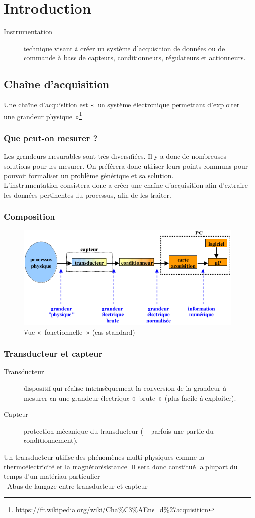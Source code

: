 \chapter{Introduction}
\begin{description}
	\item[Instrumentation] technique visant à créer un système d'acquisition de données ou de commande à base de capteurs, conditionneurs, régulateurs et actionneurs.
\end{description}
\section{Chaîne d’acquisition}
Une chaîne d'acquisition est «~un système électronique permettant d'exploiter une grandeur physique~»\footnote{\url{https://fr.wikipedia.org/wiki/Cha\%C3\%AEne_d\%27acquisition}}
\subsection{Que peut-on mesurer ?}
Les grandeurs mesurables sont très diversifiées. Il y a donc de nombreuses solutions pour les mesurer. On préférera donc utiliser leurs points communs pour pouvoir formaliser un problème générique et sa solution.\\

L'instrumentation consistera donc a créer une chaîne d'acquisition afin d'extraire les données
pertinentes du processus, afin de les traiter.
\subsection{Composition}
\begin{figure}[H] 
	\centering 
	\includegraphics[width=.8\textwidth]{ch1/image1}
	\caption{Vue «~fonctionnelle~» (cas standard)} 
\end{figure}
\subsection{Transducteur et capteur}
\begin{description}
	\item[Transducteur] dispositif qui réalise intrinsèquement la conversion de la grandeur à mesurer en une grandeur électrique «~brute~» (plus facile à exploiter).
	\item[Capteur] protection mécanique du transducteur (+ parfois une partie du conditionnement).
\end{description}
Un transducteur utilise des phénomènes multi-physiques comme la thermoélectricité et la magnétorésistance. Il sera donc constitué la plupart du temps d'un matériau particulier\\
\danger\ Abus de langage entre transducteur et capteur \danger
